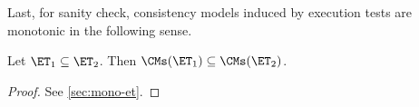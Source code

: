Last, for sanity check, consistency models induced by execution tests are monotonic in the following sense.
\begin{proposition}
\label{prop:mono-et}
Let $\ET_1 \subseteq \ET_2$. Then $\CMs(\ET_1) \subseteq \CMs(\ET_2)$.
\end{proposition}
\begin{proof}
    \ifTechReport
    
    \else
    See \cref{sec:mono-et}.
    \fi
\end{proof}
